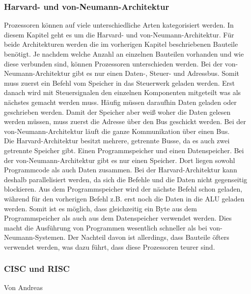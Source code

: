 \documentclass[12pt]{article}
\begin{document}
\subsubsection{Harvard- und von-Neumann-Architektur}
Prozessoren können auf viele unterschiedliche Arten kategorisiert werden. In diesem Kapitel geht es um die Harvard- und von-Neumann-Architektur. 
Für beide Architekturen werden die im vorherigen Kapitel beschriebenen Bauteile benötigt. 
Je nachdem welche Anzahl an einzelnen Bauteilen vorhanden und wie diese verbunden sind, können Prozessoren unterschieden werden. 
Bei der von-Neumann-Architektur gibt es nur einen Daten-, Steuer- und Adressbus. Somit muss zuerst ein Befehl vom Speicher in das Steuerwerk geladen werden. 
Erst danach wird mit Steuersignalen den einzelnen Komponenten mitgeteilt was als nächstes gemacht werden muss. Häufig müssen daraufhin Daten geladen oder geschrieben werden. 
Damit der Speicher aber weiß woher die Daten gelesen werden müssen, muss zuerst die Adresse über den Bus geschickt werden. 
Bei der von-Neumann-Architektur läuft die ganze Kommunikation über einen Bus.
\\
Die Harvard-Architektur besitzt mehrere, getrennte Busse, da es auch zwei getrennte Speicher gibt.
Einen Programmspeicher und einen Datenspeicher. 
Bei der von-Neumann-Architektur gibt es nur einen Speicher. 
Dort liegen sowohl Programmcode als auch Daten zusammen. 
Bei der Harvard-Architektur kann deshalb parallelisiert werden, da sich die Befehle und die Daten nicht gegenseitig blockieren. Aus dem Programmspeicher wird der nächste Befehl schon geladen, während für den vorherigen Befehl z.B. erst noch die Daten in die ALU geladen werden. 
Somit ist es möglich, dass gleichzeitig ein Byte aus dem Programmspeicher als auch aus dem Datenspeicher verwendet werden. 
Dies macht die Ausführung von Programmen wesentlich schneller als bei von-Neumann-Systemen.
Der Nachteil davon ist allerdings, dass Bauteile öfters verwendet werden, was dazu führt, dass diese Prozessoren teurer sind. 

\subsubsection{CISC und RISC}
Von Andreas\\
\end{document}
